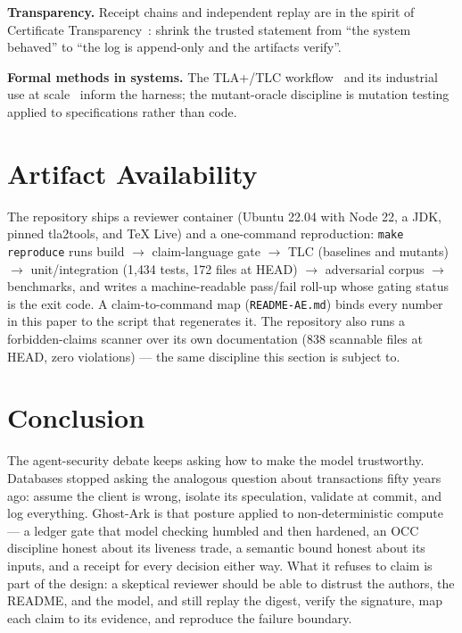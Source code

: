 \documentclass[10pt,twocolumn,letterpaper]{article}
\newcommand{\testcount}{1{,}434}
\newcommand{\testfiles}{172}
\newcommand{\claimfiles}{838}
\newcommand{\ghostark}{Ghost-Ark}
\begin{document}
\textbf{Transparency.} Receipt chains and independent replay are in the
spirit of Certificate Transparency~\cite{laurie2014ct}: shrink the trusted
statement from ``the system behaved'' to ``the log is append-only and the
artifacts verify''.

\textbf{Formal methods in systems.} The TLA+/TLC
workflow~\cite{lamport2002specifying,yu1999model} and its industrial use at
scale~\cite{newcombe2015amazon} inform the harness; the mutant-oracle
discipline is mutation testing~\cite{demillo1978mutation} applied to
specifications rather than code.

\section{Artifact Availability}
\label{sec:artifact}

The repository ships a reviewer container (Ubuntu 22.04 with Node 22, a
JDK, pinned tla2tools, and TeX Live) and a one-command reproduction:
\texttt{make reproduce} runs build $\to$ claim-language gate $\to$ TLC
(baselines and mutants) $\to$ unit/integration (\testcount{} tests,
\testfiles{} files at HEAD) $\to$ adversarial corpus $\to$ benchmarks, and
writes a machine-readable pass/fail roll-up whose gating status is the exit
code. A claim-to-command map (\texttt{README-AE.md}) binds every number in
this paper to the script that regenerates it. The repository also runs a
forbidden-claims scanner over its own documentation (\claimfiles{} scannable
files at HEAD, zero violations) --- the same discipline this section is
subject to.

\section{Conclusion}
\label{sec:conclusion}

The agent-security debate keeps asking how to make the model trustworthy.
Databases stopped asking the analogous question about transactions fifty
years ago: assume the client is wrong, isolate its speculation, validate at
commit, and log everything. \ghostark{} is that posture applied to
non-deterministic compute --- a ledger gate that model checking humbled and
then hardened, an OCC discipline honest about its liveness trade, a semantic
bound honest about its inputs, and a receipt for every decision either way.
What it refuses to claim is part of the design: a skeptical reviewer should
be able to distrust the authors, the README, and the model, and still
replay the digest, verify the signature, map each claim to its evidence, and
reproduce the failure boundary.
\end{document}

